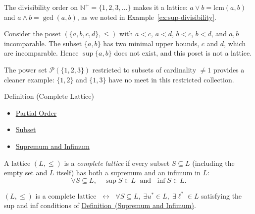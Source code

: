 \begin{example*}
\label{ex:div-lattice}
The divisibility order on $\mathbb{N}^+ = \{1, 2, 3, \ldots\}$ makes it a
lattice: $a \vee b = \mathrm{lcm}(a,b)$ and $a \wedge b = \gcd(a,b)$, as
we noted in Example~\ref{ex:sup-divisibility}.
\end{example*}

\begin{example*}
\label{ex:non-lattice}
Consider the poset $(\{a,b,c,d\}, \leq)$ with $a < c$, $a < d$, $b < c$,
$b < d$, and $a,b$ incomparable.  The subset $\{a,b\}$ has two minimal
upper bounds, $c$ and $d$, which are incomparable.  Hence $\sup\{a,b\}$
does not exist, and this poset is not a lattice.

The power set $\mathcal{P}(\{1,2,3\})$ restricted to subsets of cardinality
$\neq 1$ provides a cleaner example: $\{1,2\}$ and $\{1,3\}$ have no meet in
this restricted collection.
\end{example*}


\begin{definitionbox}{Definition (Complete Lattice)}

\begin{dependencies}
\begin{itemize}
  \item \hyperref[def:partial-order]{Partial Order}
  \item \hyperref[def:subset]{Subset}
  \item \hyperref[def:sup-inf]{Supremum and Infimum}
\end{itemize}
\end{dependencies}
\begin{definition}\label{def:complete-lattice}
A lattice $(L, \leq)$ is a \emph{complete lattice} if every subset
$S \subseteq L$ (including the empty set and $L$ itself) has both a
supremum and an infimum in $L$:
\[
  \forall S \subseteq L,\quad \sup S \in L \;\text{ and }\; \inf S \in L.
\]
\end{definition}
\end{definitionbox}\begin{remark*}
$(L, \leq)$ is a complete lattice $\;\leftrightarrow\;$
$\forall S \subseteq L,\;\exists u^* \in L,\;\exists \ell^* \in L$ satisfying
the sup and inf conditions of \hyperref[def:sup-inf]{Definition~(Supremum and Infimum)}.
\end{remark*}

